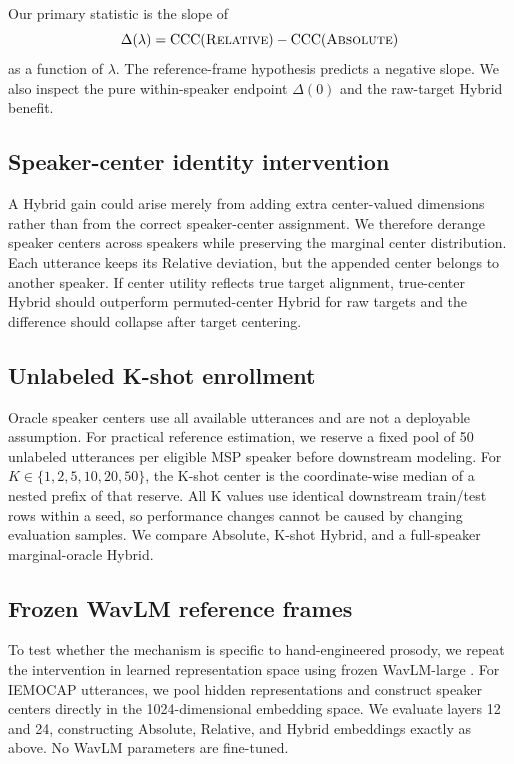 \documentclass[11pt]{article}
\begin{document}
Our primary statistic is the slope of
\begin{equation}
    \Delta(\lambda)=\mathrm{CCC}(\textsc{Relative})-\mathrm{CCC}(\textsc{Absolute})
\end{equation}
as a function of $\lambda$.
The reference-frame hypothesis predicts a negative slope.
We also inspect the pure within-speaker endpoint $\Delta(0)$ and the raw-target Hybrid benefit.

\subsection{Speaker-center identity intervention}

A Hybrid gain could arise merely from adding extra center-valued dimensions rather than from the correct speaker-center assignment.
We therefore derange speaker centers across speakers while preserving the marginal center distribution.
Each utterance keeps its Relative deviation, but the appended center belongs to another speaker.
If center utility reflects true target alignment, true-center Hybrid should outperform permuted-center Hybrid for raw targets and the difference should collapse after target centering.

\subsection{Unlabeled K-shot enrollment}

Oracle speaker centers use all available utterances and are not a deployable assumption.
For practical reference estimation, we reserve a fixed pool of 50 unlabeled utterances per eligible MSP speaker before downstream modeling.
For $K\in\{1,2,5,10,20,50\}$, the K-shot center is the coordinate-wise median of a nested prefix of that reserve.
All K values use identical downstream train/test rows within a seed, so performance changes cannot be caused by changing evaluation samples.
We compare Absolute, K-shot Hybrid, and a full-speaker marginal-oracle Hybrid.

\subsection{Frozen WavLM reference frames}

To test whether the mechanism is specific to hand-engineered prosody, we repeat the intervention in learned representation space using frozen WavLM-large \citep{chen2022wavlm}.
For IEMOCAP utterances, we pool hidden representations and construct speaker centers directly in the 1024-dimensional embedding space.
We evaluate layers 12 and 24, constructing Absolute, Relative, and Hybrid embeddings exactly as above.
No WavLM parameters are fine-tuned.
\end{document}
